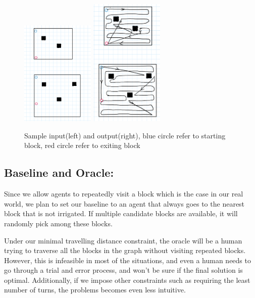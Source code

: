 \documentclass{article}
\begin{document}
\begin{normalsize}
            \begin{figure}[htp]
                \centering
                \includegraphics[width=3.5cm]{IMG_2619.jpg}
                \qquad
                \includegraphics[width=3.5cm]{IMG_2620.jpg}
                \caption{Sample input(left) and output(right), blue circle refer to starting block, red circle refer to exiting block}
            \end{figure}

		        
		    \subsection{Baseline and Oracle:}
		    
		        Since we allow agents to repeatedly visit a block which is the case in our real world, we plan to set our baseline to an agent that always goes to the nearest block that is not irrigated. If multiple candidate blocks are available, it will randomly pick among these blocks. \par 
		        
		        Under our minimal travelling distance constraint, the oracle will be a human trying to traverse all the blocks in the graph without visiting repeated blocks. However, this is infeasible in most of the situations, and even a human needs to go through a trial and error process, and won't be sure if the final solution is optimal. Additionally, if we impose other constraints such as requiring the least number of turns, the problems becomes even less intuitive. \par
		        

\end{normalsize}
\end{document}
